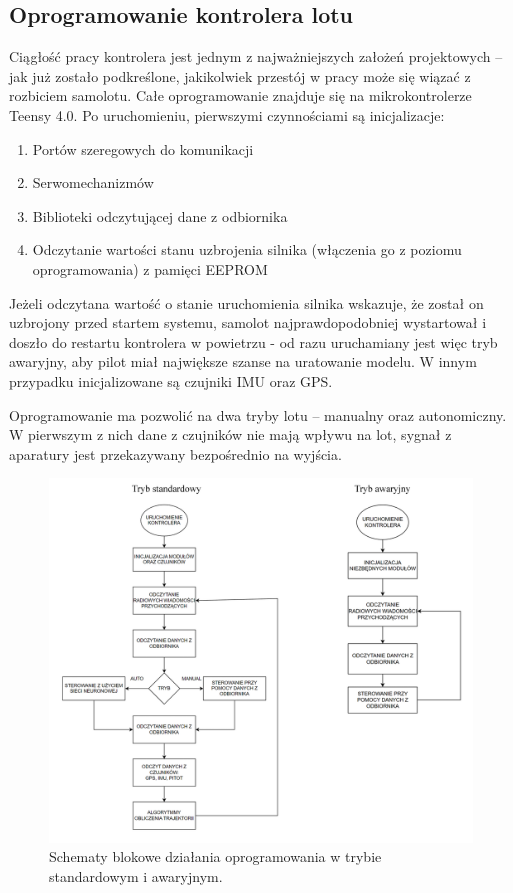\documentclass[12pt, a4paper]{article}
\begin{document}
 \clearpage
\subsection{Oprogramowanie kontrolera lotu}
Ciągłość pracy kontrolera jest jednym z najważniejszych założeń projektowych – jak już zostało podkreślone, jakikolwiek przestój w pracy może się wiązać z rozbiciem samolotu. Całe oprogramowanie znajduje się na mikrokontrolerze Teensy 4.0. Po uruchomieniu, pierwszymi czynnościami są inicjalizacje:
\begin{enumerate}

\item Portów szeregowych do komunikacji
\item Serwomechanizmów 
\item Biblioteki odczytującej dane z odbiornika
\item Odczytanie wartości stanu uzbrojenia silnika (włączenia go z poziomu oprogramowania) z pamięci EEPROM

\end{enumerate}

Jeżeli odczytana wartość o stanie uruchomienia silnika wskazuje, że został on uzbrojony przed startem systemu, samolot najprawdopodobniej wystartował i doszło do restartu kontrolera w powietrzu - od razu uruchamiany jest więc tryb awaryjny, aby pilot miał największe szanse na uratowanie modelu. W innym przypadku inicjalizowane są czujniki IMU oraz GPS.

Oprogramowanie ma pozwolić na dwa tryby lotu – manualny oraz autonomiczny. W pierwszym z nich dane z czujników nie mają wpływu na lot, sygnał z aparatury jest przekazywany bezpośrednio na wyjścia.
 
\begin{figure}[ht]
    \centering
    \includegraphics[width=1\textwidth]{diagramy}
    \caption{Schematy blokowe działania oprogramowania w trybie standardowym i awaryjnym.}
\end{figure}
\end{document}
